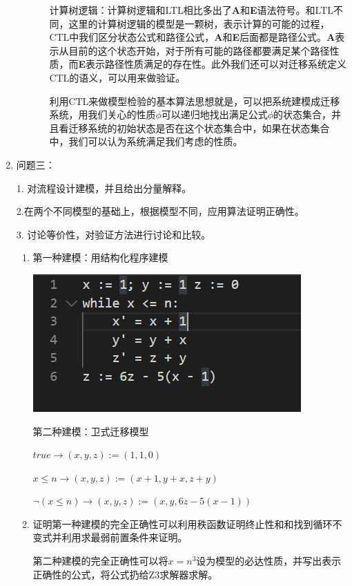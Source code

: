 \documentclass[UTF-8]{ctexart}
\begin{document}
\begin{enumerate}
\begin{itemize}
\begin{itemize}
计算树逻辑：计算树逻辑和LTL相比多出了\textbf{A}和\textbf{E}语法符号。和LTL不同，这里的计算树逻辑的模型是一颗树，表示计算的可能的过程，CTL中我们区分状态公式和路径公式，\textbf{A}和\textbf{E}后面都是路径公式。\textbf{A}表示从目前的这个状态开始，对于所有可能的路径都要满足某个路径性质，而\textbf{E}表示路径性质满足的存在性。此外我们还可以对迁移系统定义CTL的语义，可以用来做验证。

利用CTL来做模型检验的基本算法思想就是，可以把系统建模成迁移系统，用我们关心的性质$\phi$可以递归地找出满足公式$\phi$的状态集合，并且看迁移系统的初始状态是否在这个状态集合中，如果在状态集合中，我们可以认为系统满足我们考虑的性质。

\end{itemize}
\end{itemize}


\item 问题三：

1. 对流程设计建模，并且给出分量解释。

2.在两个不同模型的基础上，根据模型不同，应用算法证明正确性。

3. 讨论等价性，对验证方法进行讨论和比较。
\begin{enumerate}
\item 

第一种建模：用结构化程序建模

\includegraphics[scale=0.7]{1.PNG}

第二种建模：卫式迁移模型

$true \longrightarrow (x, y, z) := (1,1,0)$

$x \le n \longrightarrow (x, y, z) := (x+1, y+x, z+y)$

$\neg (x \le n) \longrightarrow (x, y, z) := (x, y, 6z - 5(x - 1))$



\item 
证明第一种建模的完全正确性可以利用秩函数证明终止性和和找到循环不变式并利用求最弱前置条件来证明。

第二种建模的完全正确性可以将$x = n^3$设为模型的必达性质，并写出表示正确性的公式，将公式扔给Z3求解器求解。



\end{enumerate}
\end{enumerate}
\end{document}
